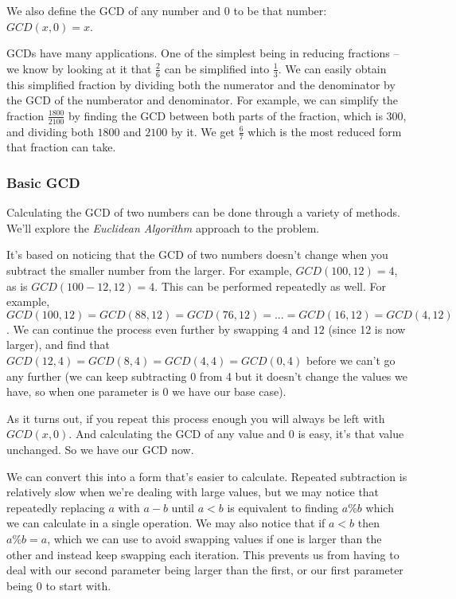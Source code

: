 We also define the GCD of any number and 0 to be that number: $GCD(x,0) = x$.

GCDs have many applications. One of the simplest being in reducing fractions -- we know by looking at it that $\frac{2}{6}$ can be simplified into $\frac{1}{3}$. We can easily obtain this simplified fraction by dividing both the numerator and the denominator by the GCD of the numberator and denominator. For example, we can simplify the fraction $\frac{1800}{2100}$ by finding the GCD between both parts of the fraction, which is 300, and dividing both $1800$ and $2100$ by it. We get $\frac{6}{7}$ which is the most reduced form that fraction can take.

\subsubsection{Basic GCD}

Calculating the GCD of two numbers can be done through a variety of methods. We'll explore the \textit{Euclidean Algorithm} approach to the problem.

It's based on noticing that the GCD of two numbers doesn't change when you subtract the smaller number from the larger. For example, $GCD(100, 12) = 4$, as is $GCD(100-12, 12) = 4$. This can be performed repeatedly as well. For example, $GCD(100, 12) = GCD(88, 12) = GCD(76, 12) = ... = GCD(16, 12) = GCD(4, 12)$. We can continue the process even further by swapping $4$ and $12$ (since 12 is now larger), and find that $GCD(12, 4) = GCD(8, 4) = GCD(4, 4) = GCD(0, 4)$ before we can't go any further (we can keep subtracting 0 from 4 but it doesn't change the values we have, so when one parameter is 0 we have our base case).

As it turns out, if you repeat this process enough you will always be left with $GCD(x, 0)$. And calculating the GCD of any value and $0$ is easy, it's that value unchanged. So we have our GCD now.

We can convert this into a form that's easier to calculate. Repeated subtraction is relatively slow when we're dealing with large values, but we may notice that repeatedly replacing $a$ with $a - b$ until $a < b$ is equivalent to finding $a \% b$ which we can calculate in a single operation. We may also notice that if $a < b$ then $a \% b = a$, which we can use to avoid swapping values if one is larger than the other and instead keep swapping each iteration. This prevents us from having to deal with our second parameter being larger than the first, or our first parameter being 0 to start with. 

